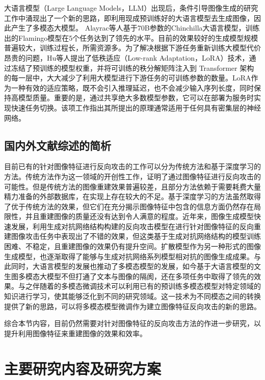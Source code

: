 \par
大语言模型（Large Language Models，LLM）出现后，条件引导图像生成的研究工作中涌现出了一个新的思路，即利用现成预训练好的大语言模型去生成图像，因此产生了多模态大模型\cite{zhang2024mmllmsrecentadvancesmultimodal}。
Alayrac\cite{NEURIPS2022_960a172b}等人基于70B参数的Chinchilla大语言模型，训练出的Flamingo模型在5个任务达到了领先的水平。目前的效果较好的生成模型规模普遍较大，训练过程长，所需资源多。为了解决根据下游任务重新训练大模型代价昂贵的问题，Hu\cite{hu2021loralowrankadaptationlarge}等人提出了低秩适应（Low-rank Adaptation，LoRA）技术，通过冻结了预训练的模型权重，并将可训练的秩分解矩阵注入到 Transformer 架构的每一层中，大大减少了利用大模型进行下游任务的可训练参数的数量。LoRA作为一种有效的适应策略，既不会引入推理延迟，也不会减少输入序列长度，同时保持高模型质量。重要的是，通过共享绝大多数模型参数，它可以在部署为服务时实现快速任务切换。该项工作指出其所提出的原理通常适用于任何具有密集层的神经网络。

\subsection{国内外文献综述的简析}
目前已有的针对图像特征进行反向攻击的工作可以分为传统方法和基于深度学习的方法。传统方法作为这一领域的开创性工作，证明了通过图像特征进行反向攻击的可能性。但是传统方法的图像重建效果普遍较差，且部分方法依赖于需要耗费大量精力准备的外部数据库，在实现上存在较大的不足。基于深度学习的方法虽然取得了优于传统方法的效果，但它们在充分揭示图像特征中包含的信息方面仍然存在局限性，并且重建图像的质量还没有达到令人满意的程度。近年来，图像生成模型快速发展，利用生成对抗网络结构构建的反向攻击模型在进行针对图像特征的反向重建图像攻击任务中表现出了不错的效果，但这类基于生成对抗网络结构的模型训练困难、不稳定，且重建图像的效果仍有提升空间。扩散模型作为另一种形式的图像生成模型，也逐渐取得了能够与生成对抗网络系列模型相对抗的图像生成成果。与此同时，大语言模型的发展也推动了多模态模型的发展，如今基于大语言模型的文生图多模态大模型不但打通了文本与图像的隔阂，还在多项任务中取得了领先的效果。与之伴随着的多模态微调技术可以利用已有的预训练多模态模型对特定领域的知识进行学习，使其能够泛化到不同的研究领域。这一技术为不同模态之间的转换提供了新的思路，可以将多模态模型微调作为建立图像特征反向攻击的新的思路。
\par
综合本节内容，目前仍然需要对针对图像特征的反向攻击方法的作进一步研究，以提升利用图像特征来重建图像的效果和效率。
\section{主要研究内容及研究方案}
